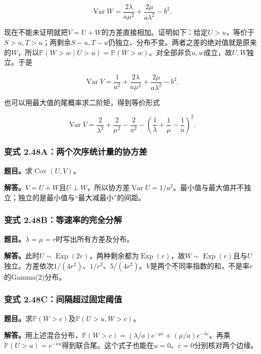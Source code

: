 \documentclass[12pt,a4paper,UTF8,fontset=fandol]{ctexart}
\begin{document}
\[\boxed{\operatorname{Var}W=
\frac{2\lambda}{a\mu^2}+\frac{2\mu}{a\lambda^2}-b^2.}\]

现在不能未证明就把\(V=U+W\)的方差直接相加。证明如下：给定\(U>u\)，等价于\(S>u,T>u\)；两剩余\(S-u,T-u\)仍独立、分布不变。两者之差的绝对值就是原来的\(W\)，所以\(\mathbb P(W>w\mid U>u)=\mathbb P(W>w)\)。对全部非负\(u,w\)成立，故\(U,W\)独立。于是

\[\boxed{\operatorname{Var}V=\frac1{a^2}+
\frac{2\lambda}{a\mu^2}+\frac{2\mu}{a\lambda^2}-b^2.}\]

也可以用最大值的尾概率求二阶矩，得到等价形式

\[\operatorname{Var}V=
\frac2{\lambda^2}+\frac2{\mu^2}-\frac2{a^2}
-\left(\frac1\lambda+\frac1\mu-\frac1a\right)^2.\]

\subsubsection{变式
2.48A：两个次序统计量的协方差}\label{ux53d8ux5f0f-2.48aux4e24ux4e2aux6b21ux5e8fux7edfux8ba1ux91cfux7684ux534fux65b9ux5dee}

\textbf{题目。}求\(\operatorname{Cov}(U,V)\)。

\textbf{解答。}\(V=U+W\)且\(U\perp W\)，所以协方差\(\operatorname{Var}U=1/a^2\)。最小值与最大值并不独立；独立的是最小值与``最大减最小''的间距。

\subsubsection{变式
2.48B：等速率的完全分解}\label{ux53d8ux5f0f-2.48bux7b49ux901fux7387ux7684ux5b8cux5168ux5206ux89e3}

\textbf{题目。}\(\lambda=\mu=r\)时写出所有方差及分布。

\textbf{解答。}此时\(U\sim\operatorname{Exp}(2r)\)，两种剩余都为\(\operatorname{Exp}(r)\)，故\(W\sim\operatorname{Exp}(r)\)且与\(U\)独立。方差依次\(1/(4r^2)\)、\(1/r^2\)、\(5/(4r^2)\)。\(V\)是两个不同率指数的和，不是率\(r\)的Gamma(2)分布。

\subsubsection{变式
2.48C：间隔超过固定阈值}\label{ux53d8ux5f0f-2.48cux95f4ux9694ux8d85ux8fc7ux56faux5b9aux9608ux503c}

\textbf{题目。}求\(\mathbb P(W>c)\)及\(\mathbb P(U>u,W>c)\)。

\textbf{解答。}用上述混合分布，\(\mathbb P(W>c)=(\lambda/a)e^{-\mu c}+(\mu/a)e^{-\lambda c}\)。再乘\(\mathbb P(U>u)=e^{-au}\)得到联合尾。这个式子也能在\(u=0\)、\(c=0\)分别核对两个边缘。
\end{document}
